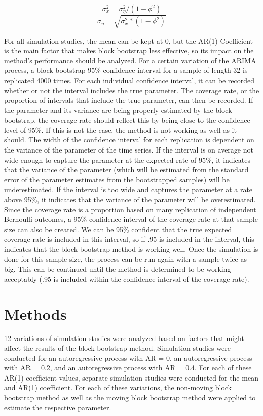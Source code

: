 \documentclass[12pt, letterpaper, titlepage]{article}
\begin{document}
\[ \sigma_{x}^{2}=\sigma_{\eta}^{2}/\left( 1-\phi^2 \right)\]
\[\sigma_{\eta}=\sqrt{\sigma_{x}^{2}*\left( 1-\phi^2 \right)}\]

For all simulation studies, the mean can be kept at 0, but the AR(1) Coefficient is the main factor that makes block bootstrap less effective, so its impact on the method's performance should be analyzed. For a certain variation of the ARIMA process, a block bootstrap 95\% confidence interval for a sample of length 32 is replicated 4000 times. For each individual confidence interval, it can be recorded whether or not the interval includes the true parameter. The coverage rate, or the proportion of intervals that include the true parameter, can then be recorded. If the parameter and its variance are being properly estimated by the block bootstrap, the coverage rate should reflect this by being close to the confidence level of 95\%. If this is not the case, the method is not working as well as it should. The width of the confidence interval for each replication is dependent on the variance of the parameter of the time series. If the interval is on average not wide enough to capture the parameter at the expected rate of 95\%, it indicates that the variance of the parameter (which will be estimated from the standard error of the parameter estimates from the bootstrapped samples) will be underestimated. If the interval is too wide and captures the parameter at a rate above 95\%, it indicates that the variance of the parameter will be overestimated. Since the coverage rate is a proportion based on many replication of independent Bernoulli outcomes, a 95\% confidence interval of the coverage rate at that sample size can also be created. We can be 95\% confident that the true expected coverage rate is included in this interval, so if .95 is included in the interval, this indicates that the block bootstrap method is working well. Once the simulation is done for this sample size, the process can be run again with a sample twice as big. This can be continued until the method is determined to be working acceptably (.95 is included within the confidence interval of the coverage rate).

\section{Methods}
\label{sec:methods}

12 variations of simulation studies were analyzed based on factors that might affect the results of the block bootstrap method. Simulation studies were conducted for an autoregressive process with AR = 0, an autoregressive process with AR = 0.2, and an autoregressive process with AR = 0.4. For each of these AR(1) coefficient values, separate simulation studies were conducted for the mean and AR(1) coefficient. For each of these variations, the non-moving block bootstrap method as well as the moving block bootstrap method were applied to estimate the respective parameter. 
\end{document}
